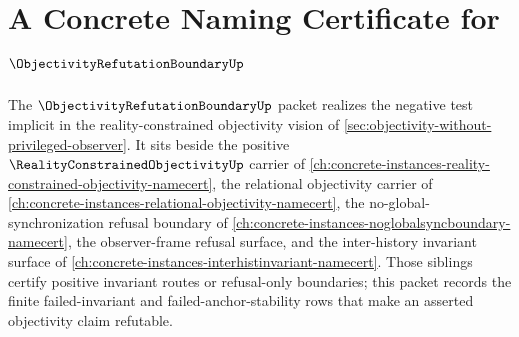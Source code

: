 \chapter{A Concrete Naming Certificate for $\ObjectivityRefutationBoundaryUp$}
\label{ch:concrete-instances-objectivity-refutation-boundary-namecert}

The $\ObjectivityRefutationBoundaryUp$ packet realizes the negative test implicit in the reality-constrained objectivity vision of \autoref{sec:objectivity-without-privileged-observer}. It sits beside the positive $\RealityConstrainedObjectivityUp$ carrier of \autoref{ch:concrete-instances-reality-constrained-objectivity-namecert}, the relational objectivity carrier of \autoref{ch:concrete-instances-relational-objectivity-namecert}, the no-global-synchronization refusal boundary of \autoref{ch:concrete-instances-noglobalsyncboundary-namecert}, the observer-frame refusal surface, and the inter-history invariant surface of \autoref{ch:concrete-instances-interhistinvariant-namecert}. Those siblings certify positive invariant routes or refusal-only boundaries; this packet records the finite failed-invariant and failed-anchor-stability rows that make an asserted objectivity claim refutable.

